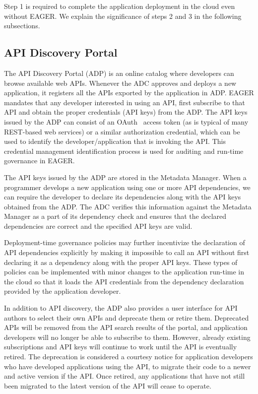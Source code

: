 Step 1 is required to complete the application deployment in the cloud even
without EAGER. We explain the significance of steps 2 and 3 in the 
following subsections.

\subsection{API Discovery Portal} 
The API Discovery Portal (ADP) is an online
catalog where developers can browse available web APIs. Whenever the ADC
approves and deploys a new application, it registers all the APIs exported by
the application in ADP.  EAGER mandates that any developer interested in using
an API, first subscribe to that API and obtain the proper credentials (API
keys) from the ADP. The API keys issued by the ADP can consist of an
OAuth~\cite{oauth2} access
token (as is typical of many REST-based web services) 
or a similar authorization credential, which can be used to identify the
developer/application that is invoking the API. This credential management
identification process is used for auditing and run-time governance in EAGER.

The API keys issued by the ADP are stored in the Metadata Manager. When a
programmer develops a new application using one or more API dependencies, we
can require the developer to declare its dependencies along with the API
keys obtained from the ADP. The ADC verifies this information against
the Metadata Manager as a part of its dependency check and ensures that the
declared dependencies are correct and the specified API keys are valid. 

Deployment-time governance policies
may further incentivize the declaration of API 
dependencies explicitly by making it 
impossible to call an API without first declaring it as a dependency along
with the proper API keys. These types of policies can be implemented
with minor changes to the
application run-time in the cloud so that it loads the API credentials from
the dependency declaration provided by the application developer.

In addition to API discovery, the ADP also provides a user
interface for API authors to select their own APIs and deprecate them or
retire them. Deprecated APIs will be removed from the API search
results of the portal, and application developers will no longer be able to 
subscribe to them. However, already existing subscriptions and API keys will continue
to work until the API is eventually retired. 
The deprecation is considered a courtesy notice for application developers
who have developed applications using the API, to migrate their code to a newer and active version
if the API. 
Once retired, any applications that have
not still been migrated to the latest version of the API will cease to operate.

